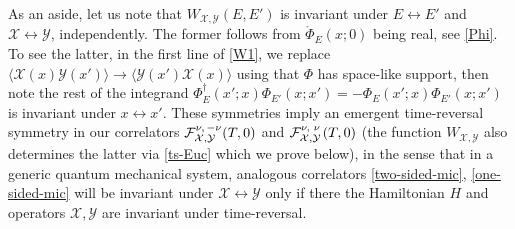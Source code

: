 \documentclass[12pt]{article}
\newcommand*{\corr}[1]{\langle{#1}\rangle}
\newcommand{\calF}{\mathcal{F}}
\newcommand{\calX}{\mathcal{X}}
\newcommand{\calY}{\mathcal{Y}}
\begin{document}
As an aside, let us note that $W_{\calX, \calY}(E,E')$ is invariant under $E \leftrightarrow E'$ and $\calX \leftrightarrow \calY$, independently. The former follows from $\mathring{\Phi}_{E}(x;0)$ being real, see \eqref{Phi}. To see the latter, in the first line of \eqref{W1}, we replace $\corr{\calX(x)\calY(x')} \to \corr{\calY(x')\calX(x)}$ using that $\Phi$ has space-like support, then note the rest of the integrand $\Phi^{\dagger}_{E}(x';x)\Phi_{E'}(x;x')=-\Phi_E(x';x)\Phi_{E'}(x;x')$ is invariant under $x \leftrightarrow x'$. These symmetries imply an emergent time-reversal symmetry in our correlators $\tensor*{\calF}{*^{\nu,\, -\nu}_{\calX,\calY}}(T,0)$ and  $\tensor*{\calF}{*^{\nu,}_{\calX,}^{\nu}_{\calY}}(T,0)$ (the function $W_{\calX, \calY}$ also determines the latter via \eqref{ts-Euc} which we prove below), in the sense that in a generic quantum mechanical system, analogous correlators \eqref{two-sided-mic}, \eqref{one-sided-mic} will be invariant under $\calX \leftrightarrow \calY$ only if there the Hamiltonian $H$ and operators $\calX, \calY$ are invariant under time-reversal.
\end{document}
